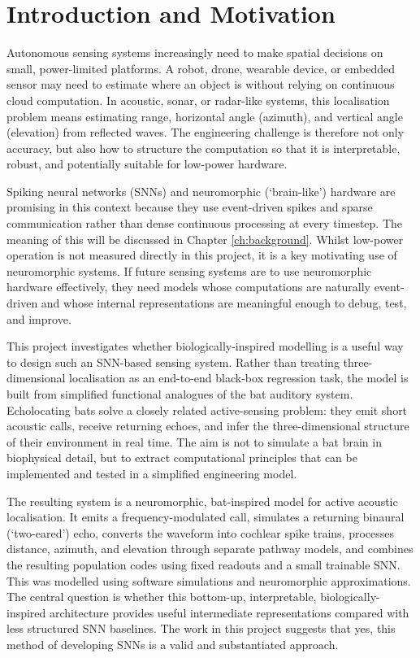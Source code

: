 \chapter{Introduction and Motivation}

Autonomous sensing systems increasingly need to make spatial decisions on small, power-limited platforms. A robot, drone, wearable device, or embedded sensor may need to estimate where an object is without relying on continuous cloud computation. In acoustic, sonar, or radar-like systems, this localisation problem means estimating range, horizontal angle (azimuth), and vertical angle (elevation) from reflected waves. The engineering challenge is therefore not only accuracy, but also how to structure the computation so that it is interpretable, robust, and potentially suitable for low-power hardware.

Spiking neural networks (SNNs) and neuromorphic (`brain-like') hardware are promising in this context because they use event-driven spikes and sparse communication rather than dense continuous processing at every timestep. The meaning of this will be discussed in Chapter \ref{ch:background}. Whilst low-power operation is not measured directly in this project, it is a key motivating use of neuromorphic systems. If future sensing systems are to use neuromorphic hardware effectively, they need models whose computations are naturally event-driven and whose internal representations are meaningful enough to debug, test, and improve.

This project investigates whether biologically-inspired modelling is a useful way to design such an SNN-based sensing system. Rather than treating three-dimensional localisation as an end-to-end black-box regression task, the model is built from simplified functional analogues of the bat auditory system. Echolocating bats solve a closely related active-sensing problem: they emit short acoustic calls, receive returning echoes, and infer the three-dimensional structure of their environment in real time. The aim is not to simulate a bat brain in biophysical detail, but to extract computational principles that can be implemented and tested in a simplified engineering model.

The resulting system is a neuromorphic, bat-inspired model for active acoustic localisation. It emits a frequency-modulated call, simulates a returning binaural (`two-eared') echo, converts the waveform into cochlear spike trains, processes distance, azimuth, and elevation through separate pathway models, and combines the resulting population codes using fixed readouts and a small trainable SNN. This was modelled using software simulations and neuromorphic approximations. The central question is whether this bottom-up, interpretable, biologically-inspired architecture provides useful intermediate representations compared with less structured SNN baselines. The work in this project suggests that yes, this method of developing SNNs is a valid and substantiated approach.

